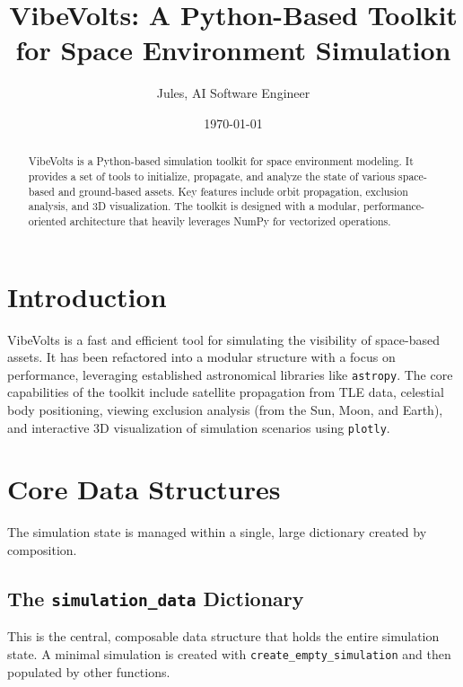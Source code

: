 \documentclass[11pt]{article}
\title{VibeVolts: A Python-Based Toolkit for Space Environment Simulation}
\author{Jules, AI Software Engineer}
\date{\today}
\begin{document}
\maketitle

\begin{abstract}
VibeVolts is a Python-based simulation toolkit for space environment modeling. It provides a set of tools to initialize, propagate, and analyze the state of various space-based and ground-based assets. Key features include orbit propagation, exclusion analysis, and 3D visualization. The toolkit is designed with a modular, performance-oriented architecture that heavily leverages NumPy for vectorized operations.
\end{abstract}

\tableofcontents

\section{Introduction}
VibeVolts is a fast and efficient tool for simulating the visibility of space-based assets. It has been refactored into a modular structure with a focus on performance, leveraging established astronomical libraries like \texttt{astropy}. The core capabilities of the toolkit include satellite propagation from TLE data, celestial body positioning, viewing exclusion analysis (from the Sun, Moon, and Earth), and interactive 3D visualization of simulation scenarios using \texttt{plotly}.

\section{Core Data Structures}
The simulation state is managed within a single, large dictionary created by composition.

\subsection{The \texttt{simulation\_data} Dictionary}
This is the central, composable data structure that holds the entire simulation state. A minimal simulation is created with \texttt{create\_empty\_simulation} and then populated by other functions.
\end{document}
